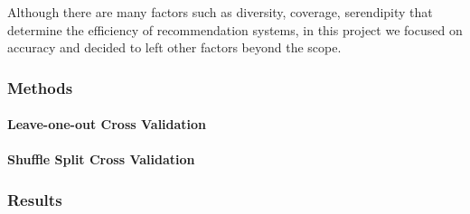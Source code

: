 	Although there are many factors such as diversity, coverage, serendipity that determine the efficiency of recommendation systems, in this project we focused on accuracy and decided to left other factors beyond the scope.
	\subsubsection{Methods}
	\paragraph{Leave-one-out Cross Validation}
	\paragraph{Shuffle Split Cross Validation}
	\subsubsection{Results}

